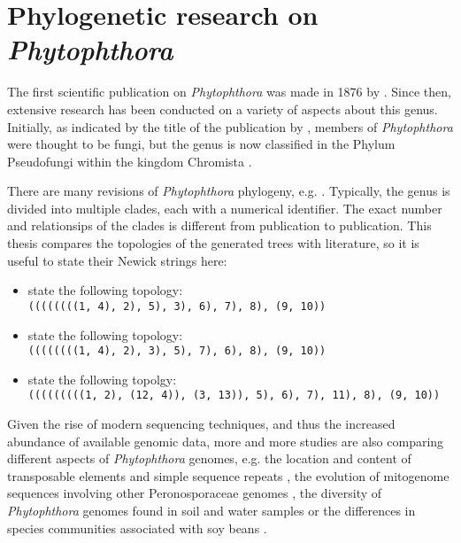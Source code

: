 \section{Phylogenetic research on \textit{Phytophthora}} 

The first scientific publication on \textit{Phytophthora} was made in 1876 by
\cite{debaryResearchesNaturePotatofungus1876,kroonGenusPhytophthoraAnno2012}.
Since then, extensive research has been conducted on a variety of aspects about
this genus. Initially, as indicated by the title of the publication by
, members of
\textit{Phytophthora} were thought to be fungi, but the genus is now classified
in the Phylum Pseudofungi within the kingdom Chromista
\cite{hardhamPhytophthoraCinnamomi2018,beakesEvolutionaryPhylogenyOomycete2012}.

There are many revisions of \textit{Phytophthora} phylogeny, e.g.
\cite{kroonGenusPhytophthoraAnno2012,yangExpandedPhylogenyGenus2017,abadPhytophthoraTaxonomicPhylogenetic2023a}.
Typically, the genus is divided into multiple clades, each with a numerical
identifier. The exact number and relationsips of the clades is different from
publication to publication. This thesis compares the topologies of the generated
trees with literature, so it is useful to state their Newick strings here:

\begin{itemize}
  \item {} state the following topology:\\
    \texttt{((((((((1, 4), 2), 5), 3), 6), 7), 8), (9, 10))}\cite{kroonGenusPhytophthoraAnno2012}
  \item {} state the following topology:\\
    \texttt{((((((((1, 4), 2), 3), 5), 7), 6), 8), (9, 10))}\cite{yangExpandedPhylogenyGenus2017}
  \item {} state the following topolgy:\\
    \texttt{(((((((((1, 2), (12, 4)), (3, 13)), 5), 6), 7), 11), 8), (9, 10))}\cite{abadPhytophthoraTaxonomicPhylogenetic2023a}
\end{itemize}

Given the rise of modern sequencing techniques, and thus the increased abundance
of available genomic data, more and more studies are also comparing different
aspects of \textit{Phytophthora} genomes, e.g. the location and content of
transposable elements and simple sequence repeats
\cite{mandalComparativeGenomeAnalysis2022}, the evolution of mitogenome
sequences involving other Peronosporaceae genomes
\cite{winkworthComparativeAnalysesComplete2022}, the diversity of
\textit{Phytophthora} genomes found in soil and water samples
\cite{catalaUseGenusSpecificAmplicon2015} or the differences in species
communities associated with soy beans
\cite{navarroComparisonSpeciesCommunities2021}.

